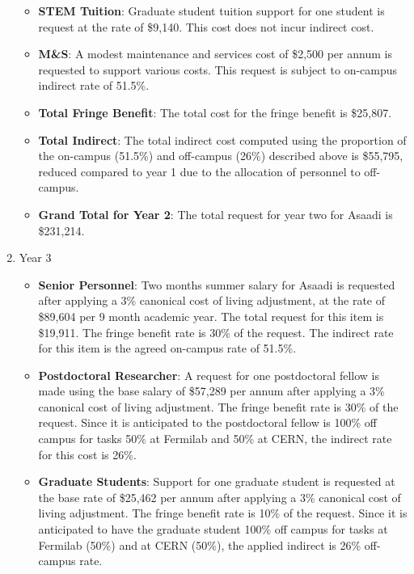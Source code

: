 \begin{enumerate}
\begin{itemize}[noitemsep,nolistsep]
\item {{\bf STEM Tuition}: Graduate student tuition support for one student is request at the rate of \$9,140.  This cost does not incur indirect cost.}

\item {{\bf M\&S}: A modest maintenance and services cost of \$2,500 per annum is requested to support various costs.   This request is subject to on-campus indirect rate of 51.5\%.}

\item {{\bf Total Fringe Benefit}: The total cost for the fringe benefit is \$25,807.}

\item {{\bf Total Indirect}: The total indirect cost computed using the proportion of the on-campus (51.5\%) and off-campus (26\%) described above is \$55,795, reduced compared to year 1 due to the allocation of personnel to off-campus.}

\item {{\bf Grand Total for Year 2}: The total request for year two for Asaadi is \$231,214.}

\end{itemize}

\item{Year 3}
\begin{itemize}[noitemsep,nolistsep]
\item{{\bf Senior Personnel}: Two months summer salary for Asaadi is requested after applying a 3\% canonical cost of living adjustment, at the rate of \$89,604 per 9 month academic year.  The total request for this item is \$19,911.   The fringe benefit rate is 30\% of the request.  The indirect rate for this item is the agreed on-campus rate of 51.5\%.}

\item {{\bf Postdoctoral Researcher}: A request for one postdoctoral fellow is made using the base salary of \$57,289 per annum after applying a 3\% canonical cost of living adjustment.  The fringe benefit rate is 30\% of the request.  Since it is anticipated to the postdoctoral fellow is 100\% off campus for tasks 50\% at Fermilab and 50\% at CERN, the indirect rate for this cost is 26\%.} 

\item{{\bf Graduate Students}: Support for one graduate student is requested at the base rate of \$25,462 per annum after applying a 3\% canonical cost of living adjustment.   The fringe benefit rate is 10\% of the request.  Since it is anticipated to have the graduate student 100\% off campus for tasks at Fermilab (50\%) and at CERN (50\%), the applied indirect is 26\% off-campus rate.}


\end{itemize}
\end{enumerate}

